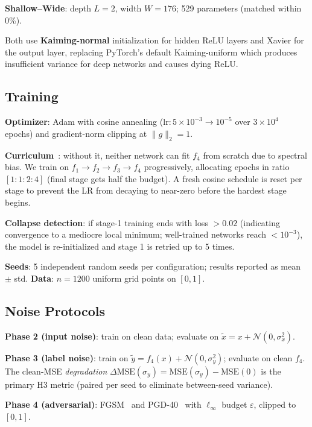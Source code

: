 \documentclass[10pt,twocolumn]{article}
\newcommand{\sigx}{\sigma_x}
\newcommand{\sigy}{\sigma_y}
\begin{document}
\textbf{Shallow–Wide}: depth $L=2$, width $W=176$; 529 parameters (matched within 0\%).

Both use \textbf{Kaiming-normal} initialization for hidden ReLU layers and Xavier for
the output layer, replacing PyTorch's default Kaiming-uniform which produces insufficient
variance for deep networks and causes dying ReLU.

\subsection{Training}

\textbf{Optimizer}: Adam with cosine annealing ($\mathrm{lr}: 5\times10^{-3} \to 10^{-5}$
over $3\times10^4$ epochs) and gradient-norm clipping at $\|g\|_2 = 1$.

\textbf{Curriculum}~\citep{bengio2009curriculum}: without it, neither network can fit $f_4$
from scratch due to spectral bias. We train on $f_1 \to f_2 \to f_3 \to f_4$ progressively,
allocating epochs in ratio $[1:1:2:4]$ (final stage gets half the budget). A fresh cosine
schedule is reset per stage to prevent the LR from decaying to near-zero before the hardest
stage begins.

\textbf{Collapse detection}: if stage-1 training ends with loss $> 0.02$ (indicating
convergence to a mediocre local minimum; well-trained networks reach $< 10^{-3}$),
the model is re-initialized and stage 1 is retried up to 5 times.

\textbf{Seeds}: 5 independent random seeds per configuration; results reported as mean $\pm$ std.
\textbf{Data}: $n=1200$ uniform grid points on $[0,1]$.

\subsection{Noise Protocols}

\textbf{Phase 2 (input noise)}: train on clean data; evaluate on $\tilde{x} = x + \mathcal{N}(0,\sigx^2)$.

\textbf{Phase 3 (label noise)}: train on $\tilde{y} = f_4(x) + \mathcal{N}(0,\sigy^2)$; evaluate on clean $f_4$.
The clean-MSE \emph{degradation} $\Delta\mathrm{MSE}(\sigy) = \mathrm{MSE}(\sigy) - \mathrm{MSE}(0)$
is the primary H3 metric (paired per seed to eliminate between-seed variance).

\textbf{Phase 4 (adversarial)}: FGSM~\citep{goodfellow2015explaining} and
PGD-40~\citep{madry2018towards} with $\ell_\infty$ budget $\varepsilon$, clipped to $[0,1]$.
\end{document}
